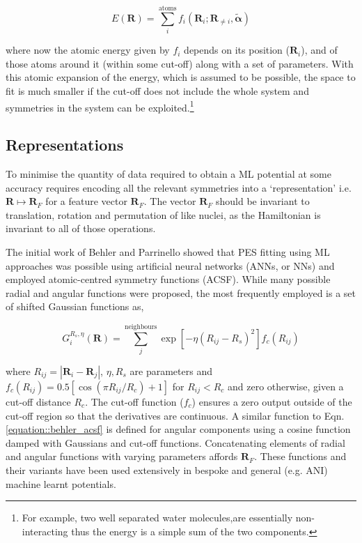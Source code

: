 \documentclass[main.tex]{subfiles}
\begin{document}
\begin{equation}
	E(\boldsymbol{R}) = \sum_i^\text{atoms} f_i (\boldsymbol{R}_i; \boldsymbol{R}_{\ne i}, \tilde{\boldsymbol{\alpha}})
\end{equation}

where now the atomic energy given by $f_i$ depends on its position ($\boldsymbol{R}_i$), and of those atoms around it (within some cut-off) along with a set of parameters. With this atomic expansion of the energy, which is assumed to be possible, the space to fit is much smaller if the cut-off does not include the whole system and symmetries in the system can be exploited.\footnote{For example, two well separated water molecules,are essentially non-interacting thus the energy is a simple sum of the two components.}

\subsection{Representations}

To minimise the quantity of data required to obtain a ML potential at some accuracy requires encoding all the relevant symmetries into a `representation' i.e. $\boldsymbol{R} \mapsto \boldsymbol{R}_F$ for a feature vector $\boldsymbol{R}_F$. The vector $\boldsymbol{R}_F$ should be invariant to translation, rotation and permutation of like nuclei, as the Hamiltonian is invariant to all of those operations.

The initial work of Behler and Parrinello showed that PES fitting using ML approaches was possible using artificial neural networks (ANNs, or NNs) and employed atomic-centred symmetry functions (ACSF).\cite{Behler2007, Behler2011} While many possible radial and angular functions were proposed, the most frequently employed is a set of shifted Gaussian functions as,

\begin{equation}
	G^{R_s, \eta}_i(\boldsymbol{R}) = \sum_j^\text{neighbours} \exp\left[-\eta (R_{ij}- R_s)^2 \right] f_c({R_{ij}})
	\label{equation::behler_acsf}
\end{equation}

where $R_{ij} = |\boldsymbol{R}_i - \boldsymbol{R}_j|$, $\eta, R_s$ are parameters and $f_c(R_{ij}) = 0.5[\cos(\pi R_{ij} / R_c) + 1]$ for $R_{ij} < R_c$ and zero otherwise, given a cut-off distance $R_c$. The cut-off function ($f_c$) ensures a zero output outside of the cut-off region so that the derivatives are continuous. A similar function to Eqn. 
\eqref{equation::behler_acsf} is defined for angular components using a cosine function damped with Gaussians and cut-off functions. Concatenating elements of radial and angular functions with varying parameters affords $\boldsymbol{R}_F$. These functions and their variants have been used extensively in bespoke and general (e.g. ANI\cite{Smith2017}) machine learnt potentials.
\end{document}
